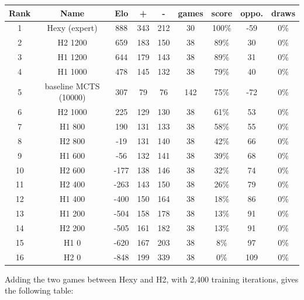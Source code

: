 \begin{table}[ht]
\small
\centering
\begin{tabular}{ c c c c c c c c c}
Rank & Name                   & Elo &   +  &  - &games &score &oppo. &draws\\
\hline
   1& Hexy (expert)          & 888&  343&  212  &  30 & 100\% &  -59 &   0\%\\
\hline
   2& H2 1200                & 659&  183&  150  &  38 &  89\% &   30 &   0\%\\
\hline
   3& H1 1200                & 644&  179&  143  &  38 &  89\% &   31 &   0\%\\
\hline
   4& H1 1000                & 478&  145&  132  &  38 &  79\% &   40 &   0\%\\
\hline
   5& baseline MCTS (10000)  & 307&   79&   76  & 142 &  75\% &  -72 &   0\%\\
\hline
   6& H2 1000                & 225&  129&  130  &  38 &  61\% &   53 &   0\%\\
\hline
   7& H1 800                 & 190&  131&  133  &  38 &  58\% &   55 &   0\%\\
\hline
   8& H2 800                 & -19&  131&  140  &  38 &  42\% &   66 &   0\%\\
\hline
   9& H1 600                 & -56&  132&  141  &  38 &  39\% &   68 &   0\%\\
\hline
  10& H2 600                 &-177&  138&  146  &  38 &  32\% &   74 &   0\%\\
\hline
  11& H2 400                 &-263&  143&  150  &  38 &  26\% &   79 &   0\%\\
\hline
  12& H1 400                 &-400&  150&  164  &  38 &  18\% &   86 &   0\%\\
\hline
  13& H1 200                 &-504&  158&  178  &  38 &  13\% &   91 &   0\%\\
\hline
  14& H2 200                 &-505&  161&  182  &  38 &  13\% &   91 &   0\%\\
\hline
  15& H1 0                   &-620&  167&  203  &  38 &   8\% &   97 &   0\%\\
\hline
  16& H2 0                   &-848&  199&  339  &  38 &   0\% &  109 &   0\%\\
\hline
\end{tabular}
\end{table}

Adding the two games between Hexy and H2, with 2,400 training iterations, gives the following table:

